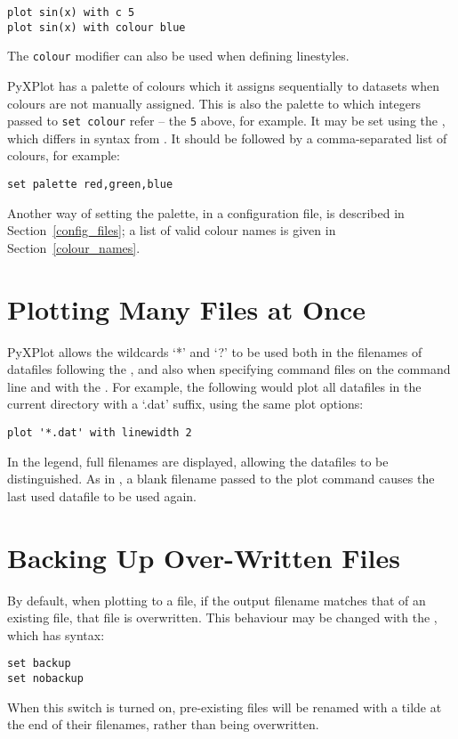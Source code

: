 \begin{verbatim}
plot sin(x) with c 5
plot sin(x) with colour blue
\end{verbatim}

\noindent The {\tt colour} modifier can also be used when defining linestyles.

 PyXPlot has a palette of colours which it
assigns sequentially to datasets when colours are not manually assigned. This
is also the palette to which integers passed to {\tt set colour} refer -- the
{\tt 5} above, for example. It may be set using the ,
which differs in syntax from \gnuplot. It should be followed by a
comma-separated list of colours, for example:

\begin{verbatim}
set palette red,green,blue
\end{verbatim}

Another way of setting the palette, in a configuration file, is described in
Section~\ref{config_files}; a list of valid colour names is given in
Section~\ref{colour_names}.

\section{Plotting Many Files at Once}


PyXPlot allows the wildcards `*' and `?' to be used both in the filenames of
datafiles following the , and also when specifying command files
on the command line and with the . For example, the following
would plot all datafiles in the current directory with a `.dat' suffix, using
the same plot options:

\begin{verbatim}
plot '*.dat' with linewidth 2
\end{verbatim}

In the legend, full filenames are displayed, allowing the datafiles to be
distinguished.  As in \gnuplot, a blank filename passed to the plot command
causes the last used datafile to be used again.

\section{Backing Up Over-Written Files}

\label{filebackup}

By default, when plotting to a file, if the output filename matches that of an
existing file, that file is overwritten. This behaviour may be changed with the
, which has syntax:

\begin{verbatim}
set backup
set nobackup
\end{verbatim}

When this switch is turned on, pre-existing files will be renamed with a tilde
at the end of their filenames, rather than being overwritten.


